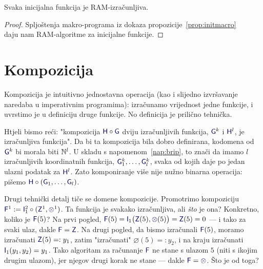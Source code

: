 \begin{korolar}[{name=[RAM-izračunljivost inicijalnih funkcija]}]\label{kor:initram}
Svaka inicijalna funkcija je RAM-izračunljiva.
\end{korolar}
\begin{proof}
Spljoštenja makro-programa iz dokaza propozicije~\ref{prop:initmacro}\\ daju nam RAM-algoritme za inicijalne funkcije.
\end{proof}

\section{Kompozicija}

Kompozicija je intuitivno jednostavna operacija (kao i slijedno izvršavanje naredaba u imperativnim programima): izračunamo vrijednost jedne funkcije, i uvrstimo je u definiciju druge funkcije. No definicija je prilično tehnička.%

Htjeli bismo reći: "kompozicija $\f H\circ\f G$ dviju izračunljivih funkcija, $\f G^k$ i $\f H^l$, je izračunljiva funkcija". Da bi ta kompozicija bila dobro definirana, kodomena od $\f G^k$ bi morala biti ${\mathbb N}^l$. U skladu s napomenom~\ref{nap:brip}, to znači da imamo $l$ izračunljivih koordinatnih funkcija, $\f G_1^k,\dotsc,\f G_l^k$, svaka od kojih daje po jedan ulazni podatak za $\f H^l$. Zato komponiranje više nije nužno binarna operacija: pišemo $\f H\circ(\f G_1,\dotsc,\f G_l)$.

Drugi tehnički detalj tiče se domene kompozicije. Promotrimo kompoziciju $\f F^1:=\f I_1^2\circ(\f Z^1,\varnothing^1)$. Ta funkcija je svakako izračunljiva, ali \emph{što} je ona? Konkretno, koliko je $\f F(5)$? Na prvi pogled, $\f F(5)=\f I_1\bigl(\f Z(5),\varnothing(5)\bigr)=\f Z(5)=0$ --- i tako za svaki ulaz, dakle $\f F =\f Z$. Na drugi pogled, da bismo izračunali $\f F(5)$, moramo izračunati $\f Z(5)=:y_1$, zatim "izračunati" $\varnothing(5)=:y_2$, i na kraju izračunati $\f I_1(y_1,y_2)=y_1$. Tako algoritam za računanje $\f F$ ne stane s ulazom $5$ (niti s ikojim drugim ulazom), jer njegov drugi korak ne stane --- dakle $\f F=\varnothing$. Što je od toga?


